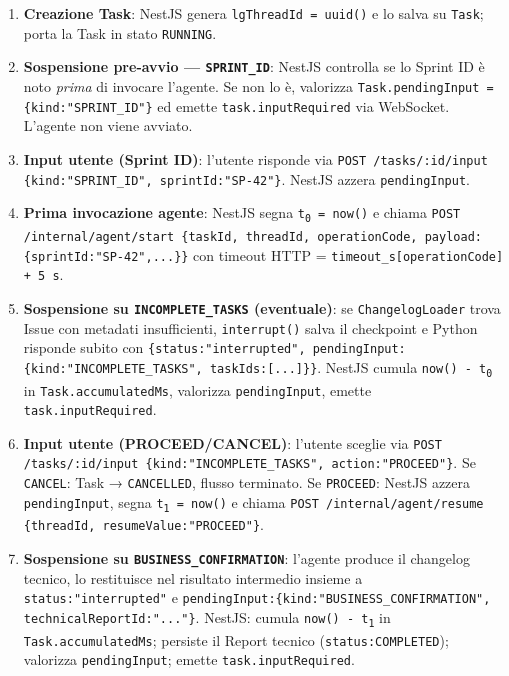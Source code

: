 \documentclass[11pt,a4paper]{article}
\begin{document}
\begin{enumerate}
    \item \textbf{Creazione Task}: NestJS genera \texttt{lgThreadId = uuid()} e lo salva su \texttt{Task}; porta la Task in stato \texttt{RUNNING}.

    \item \textbf{Sospensione pre-avvio --- \texttt{SPRINT\_ID}}: NestJS controlla se lo Sprint ID è noto \emph{prima} di invocare l'agente. Se non lo è, valorizza \texttt{Task.pendingInput = \{kind:"SPRINT\_ID"\}} ed emette \texttt{task.inputRequired} via WebSocket. L'agente non viene avviato.

    \item \textbf{Input utente (Sprint ID)}: l'utente risponde via \texttt{POST /tasks/:id/input \{kind:"SPRINT\_ID", sprintId:"SP-42"\}}. NestJS azzera \texttt{pendingInput}.

    \item \textbf{Prima invocazione agente}: NestJS segna \texttt{t\textsubscript{0} = now()} e chiama \texttt{POST /internal/agent/start \{taskId, threadId, operationCode, payload:\{sprintId:"SP-42",...\}\}} con timeout HTTP = \texttt{timeout\_s[operationCode] + 5 s}.

    \item \textbf{Sospensione su \texttt{INCOMPLETE\_TASKS} (eventuale)}: se \texttt{ChangelogLoader} trova Issue con metadati insufficienti, \texttt{interrupt()} salva il checkpoint e Python risponde subito con \texttt{\{status:"interrupted", pendingInput:\{kind:"INCOMPLETE\_TASKS", taskIds:[...]\}\}}. NestJS cumula \texttt{now() - t\textsubscript{0}} in \texttt{Task.accumulatedMs}, valorizza \texttt{pendingInput}, emette \texttt{task.inputRequired}.

    \item \textbf{Input utente (PROCEED/CANCEL)}: l'utente sceglie via \texttt{POST /tasks/:id/input \{kind:"INCOMPLETE\_TASKS", action:"PROCEED"\}}. Se \texttt{CANCEL}: Task → \texttt{CANCELLED}, flusso terminato. Se \texttt{PROCEED}: NestJS azzera \texttt{pendingInput}, segna \texttt{t\textsubscript{1} = now()} e chiama \texttt{POST /internal/agent/resume \{threadId, resumeValue:"PROCEED"\}}.

    \item \textbf{Sospensione su \texttt{BUSINESS\_CONFIRMATION}}: l'agente produce il changelog tecnico, lo restituisce nel risultato intermedio insieme a \texttt{status:"interrupted"} e \texttt{pendingInput:\{kind:"BUSINESS\_CONFIRMATION", technicalReportId:"..."\}}. NestJS: cumula \texttt{now() - t\textsubscript{1}} in \texttt{Task.accumulatedMs}; persiste il Report tecnico (\texttt{status:COMPLETED}); valorizza \texttt{pendingInput}; emette \texttt{task.inputRequired}.


\end{enumerate}
\end{document}
